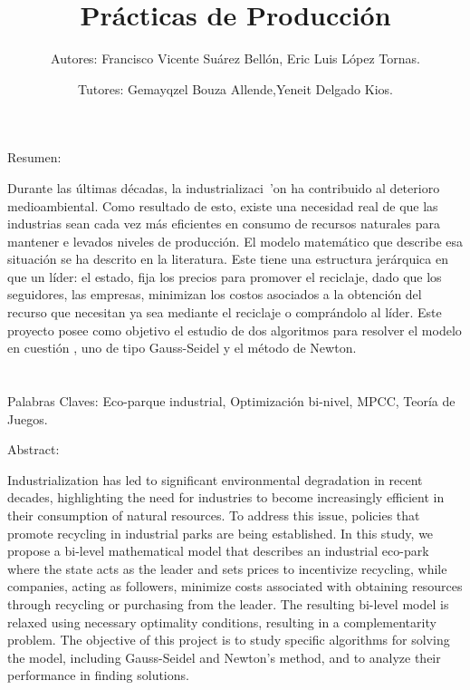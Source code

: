 \documentclass{article}
\begin{document}
\title{Pr\'acticas de Producci\'on}
\date{Tutores: Gemayqzel Bouza Allende,Yeneit Delgado Kios.}
\author{Autores: Francisco Vicente Su\'arez Bell\'on, Eric Luis  L\'opez Tornas.}
\maketitle

\begin{center}


\vspace{1cm}
{\Large Resumen:}
\end{center}

\vspace{0.5cm}
Durante las \'ultimas d\'ecadas, la industrializaci\
'on ha contribuido al deterioro medioambiental.
 Como resultado de esto, existe una necesidad real
 de que las industrias sean cada vez m\'as eficientes
  en consumo de recursos naturales para mantener e
  levados niveles de producci\'on. El modelo
   matem\'atico que describe esa situaci\'on se
    ha descrito en la literatura. Este  tiene una
     estructura jer\'arquica en que un l\'ider: el
      estado, fija los precios para promover el
       reciclaje, dado que los seguidores, las
        empresas, minimizan los costos asociados
         a la obtenci\'on del recurso que necesitan
          ya sea mediante el reciclaje o compr\'andolo 
          al l\'ider. Este proyecto posee como objetivo
            el estudio de dos algoritmos para resolver
             el modelo en cuesti\'on , uno de tipo
              Gauss-Seidel y el m\'etodo de Newton.\\
\\
\\
{\large Palabras Claves:}   Eco-parque industrial,  Optimizaci\'on bi-nivel,  MPCC, Teor\'ia de Juegos.



\begin{center}
\vspace{0.5cm}
{\Large Abstract:}
\end{center}
Industrialization has led to significant environmental degradation in recent decades,
highlighting the need for industries to become increasingly efficient in their consumption
 of natural resources. To address this issue, policies that promote recycling in industrial
  parks are being established. 
In this study, we propose a bi-level mathematical model that describes an industrial eco-park
where the state acts as the leader and sets prices to incentivize recycling, while companies,
 acting as followers, minimize costs associated with obtaining resources through recycling or
  purchasing from the leader. 
The resulting bi-level model is relaxed using necessary optimality conditions, resulting in a 
complementarity problem. 
The objective of this project is to study specific algorithms for solving the model, including
Gauss-Seidel and Newton's method, and to analyze their performance in finding solutions.\\
\vspace{0.5cm}
\end{document}
